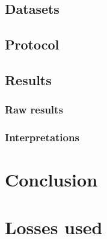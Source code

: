 \documentclass{article}
\begin{document}
\subsection{Datasets}
\subsection{Protocol}
\subsection{Results}
\subsubsection{Raw results}
\subsubsection{Interpretations}

\newpage
\section*{Conclusion}


\newpage
\appendix

\section{Losses used}
\label{appendix-losses}
\end{document}
